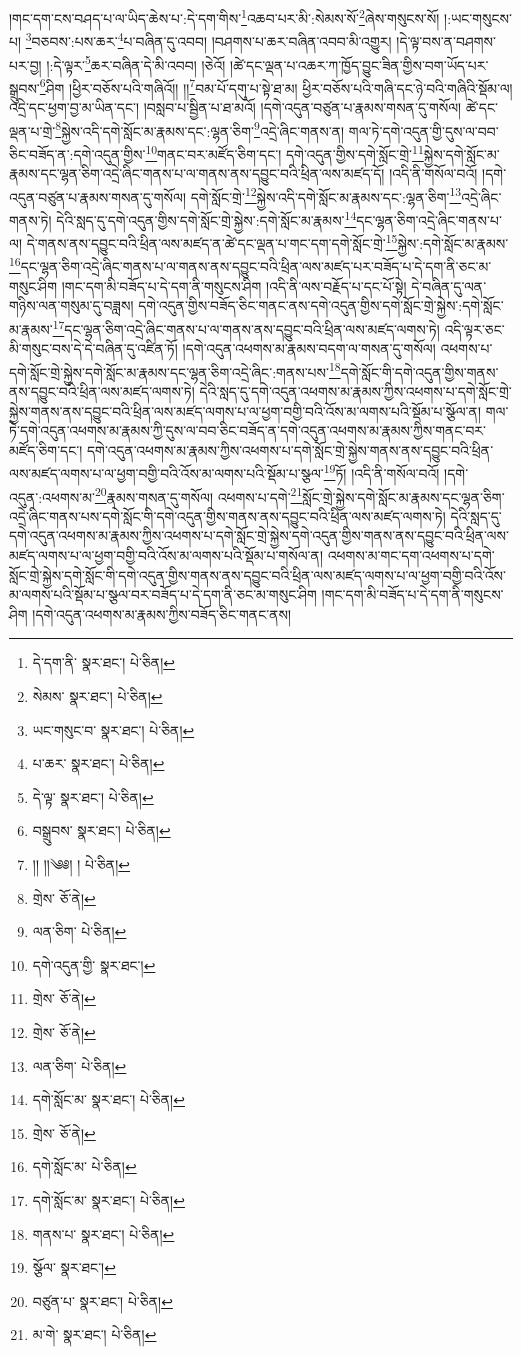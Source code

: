 །གང་དག་ངས་བཤད་པ་ལ་ཡིད་ཆེས་པ་:དེ་དག་གིས་\footnote{དེ་དག་ནི་  སྣར་ཐང་།  པེ་ཅིན། }འཆབ་པར་མི་:སེམས་སོ་\footnote{སེམས་  སྣར་ཐང་།  པེ་ཅིན། }ཞེས་གསུངས་སོ། །:ཡང་གསུངས་པ། \footnote{ཡང་གསུང་བ་  སྣར་ཐང་།  པེ་ཅིན། }བཅབས་:པས་ཆར་\footnote{པ་ཆར་  སྣར་ཐང་།  པེ་ཅིན། }པ་བཞིན་དུ་འབབ། །བཤགས་པ་ཆར་བཞིན་འབབ་མི་འགྱུར། །དེ་ལྟ་བས་ན་བཤགས་པར་བྱ། །:དེ་ལྟར་\footnote{དེ་ལྟ་  སྣར་ཐང་།  པེ་ཅིན། }ཆར་བཞིན་དེ་མི་འབབ། །ཅེའོ། །ཚེ་དང་ལྡན་པ་འཆར་ཀ་ཁྱོད་བྱུང་ཟིན་གྱིས་བག་ཡོད་པར་སྒྲུབས་\footnote{བསྒྲུབས་  སྣར་ཐང་།  པེ་ཅིན། }ཤིག །ཕྱིར་བཅོས་པའི་གཞིའོ།། །།\footnote{།། །།༄༅། །  པེ་ཅིན། }བམ་པོ་དགུ་པ་སྟེ་ཐ་མ། ཕྱིར་བཅོས་པའི་གཞི་དང་ཉེ་བའི་གཞིའི་སྡོམ་ལ། འདྲེ་དང་ཕྱག་བྱ་མ་ཡིན་དང་། །བསླབ་པ་སྦྱིན་པ་ཐ་མའོ། །དགེ་འདུན་བཙུན་པ་རྣམས་གསན་དུ་གསོལ། ཚེ་དང་ལྡན་པ་གྲེ་\footnote{གྲེས་  ཅོ་ནེ། }སྐྱེས་འདི་དགེ་སློང་མ་རྣམས་དང་:ལྷན་ཅིག་\footnote{ལན་ཅིག་  པེ་ཅིན། }འདྲེ་ཞིང་གནས་ན། གལ་ཏེ་དགེ་འདུན་གྱི་དུས་ལ་བབ་ཅིང་བཟོད་ན་:དགེ་འདུན་གྱིས་\footnote{དགེ་འདུན་གྱི་  སྣར་ཐང་། }གནང་བར་མཛོད་ཅིག་དང་། དགེ་འདུན་གྱིས་དགེ་སློང་གྲེ་\footnote{གྲེས་  ཅོ་ནེ། }སྐྱེས་དགེ་སློང་མ་རྣམས་དང་ལྷན་ཅིག་འདྲེ་ཞིང་གནས་པ་ལ་གནས་ནས་དབྱུང་བའི་ཕྲིན་ལས་མཛད་དོ། །འདི་ནི་གསོལ་བའོ། །དགེ་འདུན་བཙུན་པ་རྣམས་གསན་དུ་གསོལ། དགེ་སློང་གྲེ་\footnote{གྲེས་  ཅོ་ནེ། }སྐྱེས་འདི་དགེ་སློང་མ་རྣམས་དང་:ལྷན་ཅིག་\footnote{ལན་ཅིག་  པེ་ཅིན། }འདྲེ་ཞིང་གནས་ཏེ། དེའི་སླད་དུ་དགེ་འདུན་གྱིས་དགེ་སློང་གྲེ་སྐྱེས་:དགེ་སློང་མ་རྣམས་\footnote{དགེ་སློང་མ་  སྣར་ཐང་།  པེ་ཅིན། }དང་ལྷན་ཅིག་འདྲེ་ཞིང་གནས་པ་ལ། དེ་གནས་ནས་དབྱུང་བའི་ཕྲིན་ལས་མཛད་ན་ཚེ་དང་ལྡན་པ་གང་དག་དགེ་སློང་གྲེ་\footnote{གྲེས་  ཅོ་ནེ། }སྐྱེས་:དགེ་སློང་མ་རྣམས་\footnote{དགེ་སློང་མ་  པེ་ཅིན། }དང་ལྷན་ཅིག་འདྲེ་ཞིང་གནས་པ་ལ་གནས་ནས་དབྱུང་བའི་ཕྲིན་ལས་མཛད་པར་བཟོད་པ་དེ་དག་ནི་ཅང་མ་གསུང་ཤིག །གང་དག་མི་བཟོད་པ་དེ་དག་ནི་གསུངས་ཤིག །འདི་ནི་ལས་བརྗོད་པ་དང་པོ་སྟེ། དེ་བཞིན་དུ་ལན་གཉིས་ལན་གསུམ་དུ་བཟླས། དགེ་འདུན་གྱིས་བཟོད་ཅིང་གནང་ནས་དགེ་འདུན་གྱིས་དགེ་སློང་གྲེ་སྐྱེས་:དགེ་སློང་མ་རྣམས་\footnote{དགེ་སློང་མ་  སྣར་ཐང་།  པེ་ཅིན། }དང་ལྷན་ཅིག་འདྲེ་ཞིང་གནས་པ་ལ་གནས་ནས་དབྱུང་བའི་ཕྲིན་ལས་མཛད་ལགས་ཏེ། འདི་ལྟར་ཅང་མི་གསུང་བས་དེ་དེ་བཞིན་དུ་འཛིན་ཏོ། །དགེ་འདུན་འཕགས་མ་རྣམས་བདག་ལ་གསན་དུ་གསོལ། འཕགས་པ་དགེ་སློང་གྲེ་སྐྱེས་དགེ་སློང་མ་རྣམས་དང་ལྷན་ཅིག་འདྲེ་ཞིང་:གནས་པས་\footnote{གནས་པ་  སྣར་ཐང་།  པེ་ཅིན། }དགེ་སློང་གི་དགེ་འདུན་གྱིས་གནས་ནས་དབྱུང་བའི་ཕྲིན་ལས་མཛད་ལགས་ཏེ། དེའི་སླད་དུ་དགེ་འདུན་འཕགས་མ་རྣམས་ཀྱིས་འཕགས་པ་དགེ་སློང་གྲེ་སྐྱེས་གནས་ནས་དབྱུང་བའི་ཕྲིན་ལས་མཛད་ལགས་པ་ལ་ཕྱག་བགྱི་བའི་འོས་མ་ལགས་པའི་སྡོམ་པ་སྩོལ་ན། གལ་ཏེ་དགེ་འདུན་འཕགས་མ་རྣམས་ཀྱི་དུས་ལ་བབ་ཅིང་བཟོད་ན་དགེ་འདུན་འཕགས་མ་རྣམས་ཀྱིས་གནང་བར་མཛོད་ཅིག་དང་། དགེ་འདུན་འཕགས་མ་རྣམས་ཀྱིས་འཕགས་པ་དགེ་སློང་གྲེ་སྐྱེས་གནས་ནས་དབྱུང་བའི་ཕྲིན་ལས་མཛད་ལགས་པ་ལ་ཕྱག་བགྱི་བའི་འོས་མ་ལགས་པའི་སྡོམ་པ་སྩལ་\footnote{སྩོལ་  སྣར་ཐང་། }ཏོ། །འདི་ནི་གསོལ་བའོ། །དགེ་འདུན་:འཕགས་མ་\footnote{བཙུན་པ་  སྣར་ཐང་།  པེ་ཅིན། }རྣམས་གསན་དུ་གསོལ། འཕགས་པ་དགེ་\footnote{མ་གེ་  སྣར་ཐང་།  པེ་ཅིན། }སློང་གྲེ་སྐྱེས་དགེ་སློང་མ་རྣམས་དང་ལྷན་ཅིག་འདྲེ་ཞིང་གནས་པས་དགེ་སློང་གི་དགེ་འདུན་གྱིས་གནས་ནས་དབྱུང་བའི་ཕྲིན་ལས་མཛད་ལགས་ཏེ། དེའི་སླད་དུ་དགེ་འདུན་འཕགས་མ་རྣམས་ཀྱིས་འཕགས་པ་དགེ་སློང་གྲེ་སྐྱེས་དགེ་འདུན་གྱིས་གནས་ནས་དབྱུང་བའི་ཕྲིན་ལས་མཛད་ལགས་པ་ལ་ཕྱག་བགྱི་བའི་འོས་མ་ལགས་པའི་སྡོམ་པ་གསོལ་ན། འཕགས་མ་གང་དག་འཕགས་པ་དགེ་སློང་གྲེ་སྐྱེས་དགེ་སློང་གི་དགེ་འདུན་གྱིས་གནས་ནས་དབྱུང་བའི་ཕྲིན་ལས་མཛད་ལགས་པ་ལ་ཕྱག་བགྱི་བའི་འོས་མ་ལགས་པའི་སྡོམ་པ་སྩལ་བར་བཟོད་པ་དེ་དག་ནི་ཅང་མ་གསུང་ཤིག །གང་དག་མི་བཟོད་པ་དེ་དག་ནི་གསུངས་ཤིག །དགེ་འདུན་འཕགས་མ་རྣམས་ཀྱིས་བཟོད་ཅིང་གནང་ནས། 